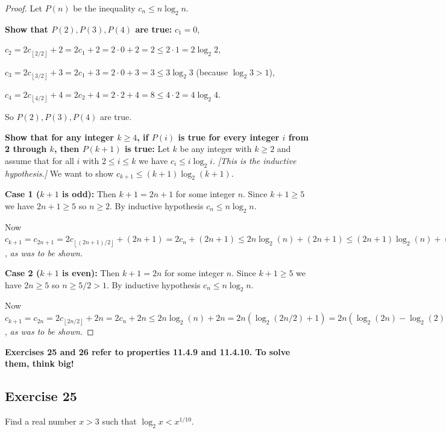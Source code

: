 \documentclass[14pt]{extarticle}
\newcommand{\cy}{\color{cyan}}
\newcommand{\floor}[1]{{\left\lfloor#1\right\rfloor}}
\begin{document}
\begin{proof}
    Let \(P(n)\) be the inequality \(c_n \leq n \log_2 n\).

        {\bf Show that \(P(2), P(3), P(4)\) are true:} \(c_1 = 0\),

    \(c_2 = 2c_{\floor{2/2}} + 2 = 2c_1+ 2 = 2 \cdot 0 + 2 = 2 \leq 2 \cdot 1 = 2 \log_2 2\),

    \(c_3 = 2c_{\floor{3/2}} + 3 = 2c_1 + 3 = 2 \cdot 0 + 3 = 3 \leq 3 \log_2 3\) (because \(\log_2 3 > 1\)),

    \(c_4 = 2c_{\floor{4/2}} + 4 = 2c_2 + 4 = 2 \cdot 2 + 4 = 8 \leq 4 \cdot 2 = 4 \log_2 4\).

    So \(P(2), P(3), P(4)\) are true.

        {\bf Show that for any integer \(k \geq 4\), if \(P(i)\) is true for every integer \(i\) from 2 through \(k\), then
            \(P(k + 1)\) is true:} Let \(k\) be any integer with \(k \geq 2\) and assume that for all \(i\) with \(2 \leq i \leq k\) we
    have \(c_i \leq i \log_2 i\). {\it [This is the inductive hypothesis.]} We want to show \(c_{k+1}\leq(k+1)\log_2(k+1)\).

        {\bf Case 1 (\(k+1\) is odd):} Then \(k+1 = 2n+1\) for some integer \(n\). Since \(k+1 \geq 5\) we have \(2n+1 \geq 5\) so
    \(n \geq 2\). By inductive hypothesis \(c_n \leq n \log_2 n\).

    Now \(c_{k+1} = c_{2n+1} = 2c_{\floor{(2n+1)/2}} + (2n+1) = 2c_n + (2n+1) \leq 2n \log_2(n) + (2n+1) \leq (2n+1)
    \log_2(n) + (2n+1) = (2n+1)(\log_2(n) + 1) \leq (2n+1)(\log_2(n+\frac{1}{2}) + 1) = (2n+1)(\log_2((2n+1)/2) + 1)
    = (2n+1)(\log_2(2n+1) - \log_2(2) + 1) = (2n+1)(\log_2(2n+1) - 1 + 1) = (2n+1)\log_2(2n+1) = (k+1)\log_2(k+1)\),
    {\it as was to be shown.}

        {\bf Case 2 (\(k+1\) is even):} Then \(k+1 = 2n\) for some integer \(n\). Since \(k+1 \geq 5\) we have \(2n \geq 5\) so
    \(n \geq 5/2 > 1\). By inductive hypothesis \(c_n \leq n \log_2 n\).

    Now \(c_{k+1} = c_{2n} = 2c_{\floor{2n/2}} + 2n = 2c_n + 2n \leq 2n \log_2(n) + 2n = 2n(\log_2(2n/2) + 1) = 2n(\log_2(2n)
    - \log_2(2) + 1) = 2n \log_2(2n) = (k+1)\log_2(k+1)\), {\it as was to be shown.}
\end{proof}

{\bf \cy Exercises 25 and 26 refer to properties 11.4.9 and 11.4.10. To solve them, think big!}

\subsection{Exercise 25}
Find a real number \(x > 3\) such that \(\log_2 x < x^{1/10}\).
\end{document}
